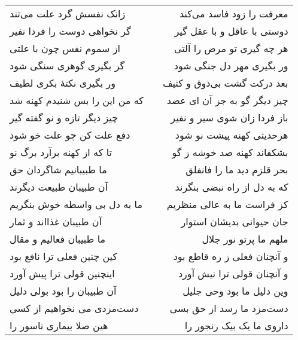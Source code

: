 \begin{center}
\begin{longtable}{l p{0.5cm} r}
زانک نفسش گرد علت می‌تند
&&
معرفت را زود فاسد می‌کند
\\
گر نخواهی دوست را فردا نفیر
&&
دوستی با عاقل و با عقل گیر
\\
از سموم نفس چون با علتی
&&
هر چه گیری تو مرض را آلتی
\\
گر بگیری گوهری سنگی شود
&&
ور بگیری مهر دل جنگی شود
\\
ور بگیری نکتهٔ بکری لطیف
&&
بعد درکت گشت بی‌ذوق و کثیف
\\
که من این را بس شنیدم کهنه شد
&&
چیز دیگر گو به جز آن ای عضد
\\
چیز دیگر تازه و نو گفته گیر
&&
باز فردا زان شوی سیر و نفیر
\\
دفع علت کن چو علت خو شود
&&
هرحدیثی کهنه پیشت نو شود
\\
تا که از کهنه برآرد برگ نو
&&
بشکفاند کهنه صد خوشه ز گو
\\
ما طبیبانیم شاگردان حق
&&
بحر قلزم دید ما را فانفلق
\\
آن طبیبان طبیعت دیگرند
&&
که به دل از راه نبضی بنگرند
\\
ما به دل بی واسطه خوش بنگریم
&&
کز فراست ما به عالی منظریم
\\
آن طبیبان غذااند و ثمار
&&
جان حیوانی بدیشان استوار
\\
ما طبیبان فعالیم و مقال
&&
ملهم ما پرتو نور جلال
\\
کین چنین فعلی ترا نافع بود
&&
و آنچنان فعلی ز ره قاطع بود
\\
اینچنین قولی ترا پیش آورد
&&
و آنچنان قولی ترا نیش آورد
\\
آن طبیبان را بود بولی دلیل
&&
وین دلیل ما بود وحی جلیل
\\
دست‌مزدی می نخواهیم از کسی
&&
دست‌مزد ما رسد از حق بسی
\\
هین صلا بیماری ناسور را
&&
داروی ما یک بیک رنجور را
\\
\end{longtable}
\end{center}

